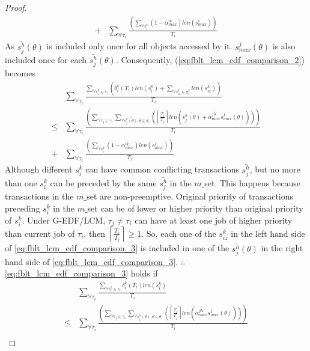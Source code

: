 \documentclass[12pt,english]{report}
\newtheorem{proof}{Proof}
\begin{document}
\begin{proof}
\begin{eqnarray}
+ & \sum_{\forall\tau_{i}}\frac{\left(\sum_{\forall s_{i}^{k}}\left(1-\alpha_{max}^{ik}\right)len\left(s_{max}^{i}\right)\right)}{T_{i}}\nonumber 
\end{eqnarray}
As $\bar{s_{j}^{h}}(\theta)$ is included only once for all objects
accessed by it. $s_{max}^{j}(\theta)$ is also included once for each
$\bar{s_{j}^{h}}(\theta)$. Consequently, (\ref{eq:fblt_lcm_edf_comparison_2})
becomes 
\begin{eqnarray}
 & \sum_{\forall\tau_{i}}\frac{\sum_{\forall s_{i}^{k}\in s_{i}}\left(\delta_{i}^{k}(T_{i})len(s_{i}^{k})+\sum_{\forall s_{iz}^{k}\in\chi_{i}^{k}}len(s_{iz}^{k})\right)}{T_{i}}\label{eq:fblt_lcm_edf_comparison_3}\\
\le & \sum_{\forall\tau_{i}}\frac{\left(\sum_{\forall\tau_{j}\in\gamma_{i}}\sum_{\forall\bar{s_{j}^{h}(\theta)},\theta\in\theta_{i}}\left(\left\lceil \frac{T_{i}}{T_{j}}\right\rceil len\left(\bar{s_{j}^{h}(\theta)}+\bar{\alpha_{max}^{jh}}s_{max}^{j}(\theta)\right)\right)\right)}{T_{i}}\nonumber \\
+ & \sum_{\forall\tau_{i}}\frac{\left(\sum_{\forall s_{i}^{k}}\left(1-\alpha_{max}^{ik}\right)len\left(s_{max}^{i}\right)\right)}{T_{i}}\nonumber 
\end{eqnarray}
Although different $s_{i}^{k}$ can have common conflicting transactions
$\bar{s_{j}^{h}}$, but no more than one $s_{i}^{k}$ can be preceded
by the same $\bar{s_{j}^{h}}$ in the $m\_$set. This happens because
transactions in the $m\_$set are non-preemptive. Original priority
of transactions preceding $s_{i}^{k}$ in the $m\_$set can be of
lower or higher priority than original priority of $s_{i}^{k}$. Under
G-EDF/LCM, $\tau_{j}\ne\tau_{i}$ can have at least one job of higher
priority than current job of $\tau_{i}$, then $\left\lceil \frac{T_{i}}{T_{j}}\right\rceil \ge1$.
So, each one of the $s_{iz}^{k}$ in the left hand side of \eqref{eq:fblt_lcm_edf_comparison_3}
is included in one of the $\bar{s_{j}^{h}}(\theta)$ in the right
hand side of \eqref{eq:fblt_lcm_edf_comparison_3}. $\therefore$
\eqref{eq:fblt_lcm_edf_comparison_3} holds if 
\begin{eqnarray}
 & \sum_{\forall\tau_{i}}\frac{\sum_{\forall s_{i}^{k}\in s_{i}}\delta_{i}^{k}(T_{i})len(s_{i}^{k})}{T_{i}}\label{eq:fblt_lcm_edf_comparison_4}\\
\le & \sum_{\forall\tau_{i}}\frac{\left(\sum_{\forall\tau_{j}\in\gamma_{i}}\sum_{\forall\bar{s_{j}^{h}(\theta)},\theta\in\theta_{i}}\left(\left\lceil \frac{T_{i}}{T_{j}}\right\rceil len\left(\bar{\alpha_{max}^{jh}}s_{max}^{j}(\theta)\right)\right)\right)}{T_{i}}\nonumber \\

\end{eqnarray}
\end{proof}
\end{document}
